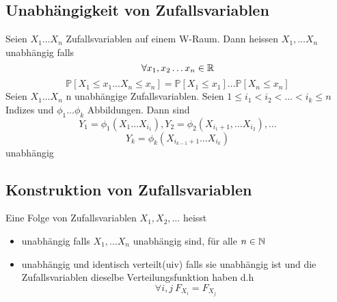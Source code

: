 \subsection{Unabhängigkeit von Zufallsvariablen}
\Def[2.5] \newline
Seien \( X_1 \dots X_n \) Zufallsvariablen auf einem W-Raum. Dann heissen \(X_1, \dots X_n \) unabhängig falls \[ \forall x_1, x_2 \dots x_n \in \mathbb{R} \] \[\mathbb{P}[X_1 \leq x_1 \dots X_n \leq x_n ] = \mathbb{P}[X_1 \leq x_1] \dots \mathbb{P}[X_n \leq x_n]\]
 \newline
Seien \(X_1 \dots X_n\) n unabhängige Zufallsvariablen. Seien \( 1 \leq i_1 < i_2 < \dots < i_k \leq n \) Indizes und \(\phi_1 \dots \phi_k\) Abbildungen. Dann sind  \[ Y_1 = \phi_1(X_1 \dots X_{i_1}), Y_2 = \phi_2(X_{i_{1}+1}, \dots X_{i_2}), \dots \] \[Y_k = \phi_k(X_{i_{k-1}+1} \dots X_{i_k})\] unabhängig \newline
\newline \newline
\Def[2.8] \newline
\subsection{Konstruktion von Zufallsvariablen}
Eine Folge von Zufallsvariablen \(X_1, X_2, \dots \) heisst
\begin{itemize}
    \item unabhängig falls \(X_1, \dots X_n \) unabhängig sind, für alle \(n \in  \mathbb{N}\)
    \item unabhängig und identisch verteilt(uiv) falls sie unabhängig ist und die Zufallsvariablen dieselbe Verteilungsfunktion haben d.h \[ \forall i, j \ F_{X_i} = F_{X_j}\]
\end{itemize}